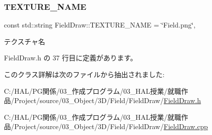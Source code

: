 \subsubsection{\texorpdfstring{T\+E\+X\+T\+U\+R\+E\+\_\+\+N\+A\+ME}{TEXTURE\_NAME}}
{\footnotesize\ttfamily const std\+::string Field\+Draw\+::\+T\+E\+X\+T\+U\+R\+E\+\_\+\+N\+A\+ME = \char`\"{}Field.\+png\char`\"{}\hspace{0.3cm}{\ttfamily [static]}, {\ttfamily [private]}}



テクスチャ名 



 Field\+Draw.\+h の 37 行目に定義があります。



このクラス詳解は次のファイルから抽出されました\+:\begin{DoxyCompactItemize}
\item 
C\+:/\+H\+A\+L/\+P\+G関係/03\+\_\+作成プログラム/03\+\_\+\+H\+A\+L授業/就職作品/\+Project/source/03\+\_\+\+Object/3\+D/\+Field/\+Field\+Draw/\mbox{\hyperlink{_field_draw_8h}{Field\+Draw.\+h}}\item 
C\+:/\+H\+A\+L/\+P\+G関係/03\+\_\+作成プログラム/03\+\_\+\+H\+A\+L授業/就職作品/\+Project/source/03\+\_\+\+Object/3\+D/\+Field/\+Field\+Draw/\mbox{\hyperlink{_field_draw_8cpp}{Field\+Draw.\+cpp}}\end{DoxyCompactItemize}
